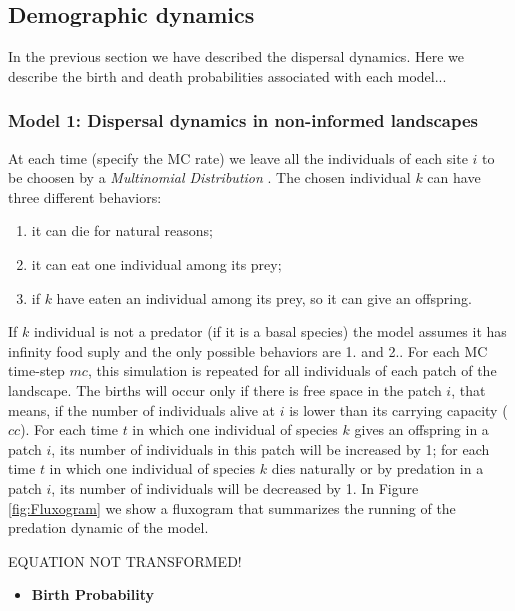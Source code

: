 \subsection{Demographic dynamics}

In the previous section we have described the dispersal dynamics. Here
we describe the birth and death probabilities associated with each model...

\subsubsection{Model 1: Dispersal dynamics in non-informed landscapes}

At each time (specify the MC rate) we leave all the individuals of
each site $i$ to be choosen by a \emph{Multinomial Distribution}
\cite{levin1981representation}. The chosen individual $k$ can have
three different behaviors:
\begin{enumerate}
\item it can die for natural reasons;
\item it can eat one individual among its prey; 
\item if $k$ have eaten an individual among its prey, so it can give an offspring. 
\end{enumerate}
If $k$ individual is not a predator (if it is a basal species) the
model assumes it has infinity food suply and the only possible
behaviors are 1. and 2.. For each MC time-step $mc$, this simulation
is repeated for all individuals of each patch of the landscape. The
births will occur only if there is free space in the patch $i$, that
means, if the number of individuals alive at $i$ is lower than its
carrying capacity ($cc$). For each time $t$ in which one individual of
species $k$ gives an offspring in a patch $i$, its number of
individuals in this patch will be increased by 1; for each time $t$ in
which one individual of species $k$ dies naturally or by predation in
a patch $i$, its number of individuals will be decreased by 1. In
Figure \ref{fig:Fluxogram} we show a fluxogram that summarizes the
running of the predation dynamic of the model.

EQUATION NOT TRANSFORMED!

\vspace{1cm}
\begin{itemize}
\item \textbf{Birth Probability}
\end{itemize}

